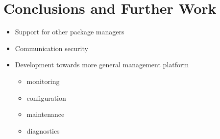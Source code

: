 \section{Conclusions and Further Work}

\begin{itemize}
\item Support for other package managers
\item Communication security
\item Development towards more general management platform
\begin{itemize}
\item monitoring
\item configuration
\item maintenance
\item diagnostics
\end{itemize}
\end{itemize}

